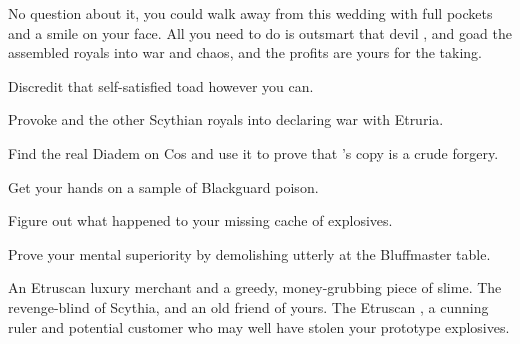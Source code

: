 \documentclass[char]{Kos}
\begin{document}
No question about it, you could walk away from this wedding with full pockets and a smile on your face. All you need to do is outsmart that devil \cMerchant{}, and goad the assembled royals into war and chaos, and the profits are yours for the taking.

\begin{itemz}[Goals]
\item Discredit that self-satisfied toad \cMerchant{} however you can.
\item Provoke \cScythiaQueen{\Monarch} \cScythiaQueen{} and the other Scythian royals into declaring war with Etruria.
\item Find the real Diadem on Cos and use it to prove that \cMerchant{}'s copy is a crude forgery.
\item Get your hands on a sample of Blackguard poison.
\item Figure out what happened to your missing cache of explosives.
\item Prove your mental superiority by demolishing \cMerchant{} utterly at the Bluffmaster table.
\end{itemz}

\begin{contacts}
\contact{\cMerchant{}} An Etruscan luxury merchant and a greedy, money-grubbing piece of slime.
\contact{\cScythiaQueen{}} The revenge-blind \cScythiaQueen{\monarch} of Scythia, and an old friend of yours.
\contact{\cEtruriaKing{}} The Etruscan \cEtruriaKing{\monarch}, a cunning ruler and potential customer who may well have stolen your prototype explosives.
\end{contacts}
\end{document}
